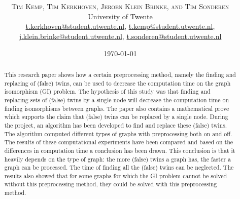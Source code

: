 \documentclass[twoside]{article}
\title{\vspace{-15mm}\fontsize{24pt}{10pt}\selectfont\textbf{\articletitle}} %
\author{
\large
\textsc{Tim Kemp, Tim Kerkhoven, Jeroen Klein Brinke, and Tim Sonderen}\\[2mm] %
\normalsize University of Twente \\ %
\normalsize \href{mailto:t.kerkhoven@student.utwente.nl}{t.kerkhoven@student.utwente.nl}, 
\href{mailto:t.kemp@student.utwente.nl}{t.kemp@student.utwente.nl},\\ \normalsize
\href{mailto:j.klein.brinke@student.utwente.nl}{j.klein.brinke@student.utwente.nl}, \href{mailto:t.sonderen@student.utwente.nl}{t.sonderen@student.utwente.nl}%
}
\date{\today}
\theoremstyle{definition}
\theoremstyle{plain}
\begin{document}
\thispagestyle{empty}
\maketitle %


\begin{abstract}

This research paper shows how a certain preprocessing method, namely the finding and replacing of (false) twins, can be used to decrease the computation time on the graph isomorphism (GI) problem. The hypothesis of this study was that finding and replacing sets of (false) twins by a single node will decrease the computation time on finding isomorphisms between graphs. The paper also contains a mathematical prove which supports the claim that (false) twins can be replaced by a single node. During the project, an algorithm has been developed to find and replace these (false) twins.  The algorithm computed different types of graphs with preprocessing both on and off. The results of these computational experiments have been compared and based on the differences in computation time a conclusion has been drawn. This conclusion is that it heavily depends on the type of graph: the more (false) twins a graph has, the faster a graph can be processed. The time of finding all the (false) twins can be neglected. The results also showed that for some graphs for which the GI problem cannot be solved without this preprocessing method, they could be solved with this preprocessing method. 

\end{abstract}

\end{document}
